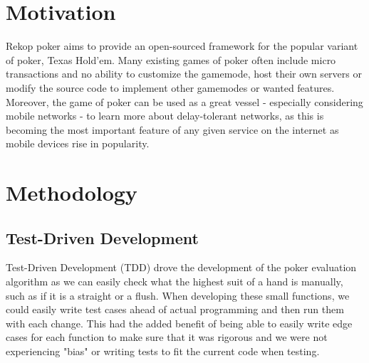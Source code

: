 \documentclass[11pt]{article}
\begin{document}

\newpage
\section{Motivation}



Rekop poker aims to provide an open-sourced framework for the popular variant of poker, Texas Hold'em. Many existing games of poker often include micro transactions and no ability to customize the gamemode, host their own servers or modify the source code to implement other gamemodes or wanted features. Moreover, the game of poker can be used as a great vessel - especially considering mobile networks - to learn more about delay-tolerant networks, as this is becoming the most important feature of any given service on the internet as mobile devices rise in popularity. 

\section{Methodology}

\subsection{Test-Driven Development}

Test-Driven Development (TDD) drove the development of the poker evaluation algorithm as we can easily check what the highest suit of a hand is manually, such as if it is a straight or a flush. When developing these small functions, we could easily write test cases ahead of actual programming and then run them with each change. This had the added benefit of being able to easily write edge cases for each function to make sure that it was rigorous and we were not experiencing "bias" or writing tests to fit the current code when testing.  \\
\end{document}
